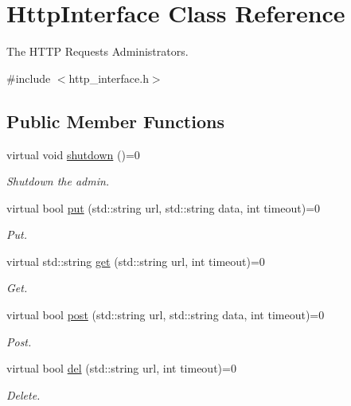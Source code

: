 \hypertarget{classHttpInterface}{}\section{Http\+Interface Class Reference}
\label{classHttpInterface}


The H\+T\+TP Requests Administrators.  




{\ttfamily \#include $<$http\+\_\+interface.\+h$>$}

\subsection*{Public Member Functions}
\begin{DoxyCompactItemize}
\item 
virtual void \hyperlink{classHttpInterface_a3ac819dcec45535bf3c0fa614c5bdfce}{shutdown} ()=0\hypertarget{classHttpInterface_a3ac819dcec45535bf3c0fa614c5bdfce}{}\label{classHttpInterface_a3ac819dcec45535bf3c0fa614c5bdfce}

\begin{DoxyCompactList}\small\item\em Shutdown the admin. \end{DoxyCompactList}\item 
virtual bool \hyperlink{classHttpInterface_a57d393f0886723f1e1efadd56faa2b80}{put} (std\+::string url, std\+::string data, int timeout)=0
\begin{DoxyCompactList}\small\item\em Put. \end{DoxyCompactList}\item 
virtual std\+::string \hyperlink{classHttpInterface_a1304fcad3f7376da136288d280f658d9}{get} (std\+::string url, int timeout)=0
\begin{DoxyCompactList}\small\item\em Get. \end{DoxyCompactList}\item 
virtual bool \hyperlink{classHttpInterface_a089efdf4a6e47e7a13b028e75991439b}{post} (std\+::string url, std\+::string data, int timeout)=0
\begin{DoxyCompactList}\small\item\em Post. \end{DoxyCompactList}\item 
virtual bool \hyperlink{classHttpInterface_acc7539a13d663ba17604acdad6e83bf4}{del} (std\+::string url, int timeout)=0
\begin{DoxyCompactList}\small\item\em Delete. \end{DoxyCompactList}\end{DoxyCompactItemize}


